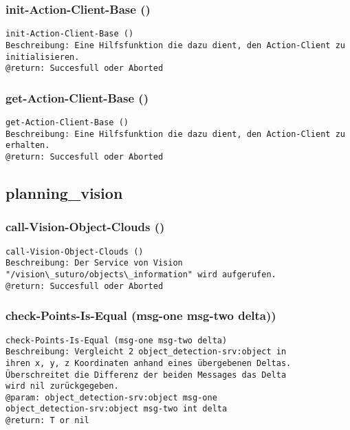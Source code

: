\documentclass{suturo}
\begin{document}
\subsubsection{init-Action-Client-Base ()}
\begin{verbatim}
init-Action-Client-Base ()
Beschreibung: Eine Hilfsfunktion die dazu dient, den Action-Client zu initialisieren.
@return: Succesfull oder Aborted
\end{verbatim}


\subsubsection{get-Action-Client-Base ()}
\begin{verbatim}
get-Action-Client-Base ()
Beschreibung: Eine Hilfsfunktion die dazu dient, den Action-Client zu erhalten.
@return: Succesfull oder Aborted
\end{verbatim}

\subsection{planning\_vision}

\subsubsection{call-Vision-Object-Clouds ()}
\begin{verbatim}
call-Vision-Object-Clouds ()
Beschreibung: Der Service von Vision  "/vision\_suturo/objects\_information" wird aufgerufen.
@return: Succesfull oder Aborted
\end{verbatim}

\subsubsection{check-Points-Is-Equal (msg-one msg-two delta))}
\begin{verbatim}
check-Points-Is-Equal (msg-one msg-two delta)
Beschreibung: Vergleicht 2 object_detection-srv:object in
ihren x, y, z Koordinaten anhand eines übergebenen Deltas.
Überschreitet die Differenz der beiden Messages das Delta
wird nil zurückgegeben.
@param: object_detection-srv:object msg-one 
object_detection-srv:object msg-two int delta
@return: T or nil
\end{verbatim}
\end{document}

